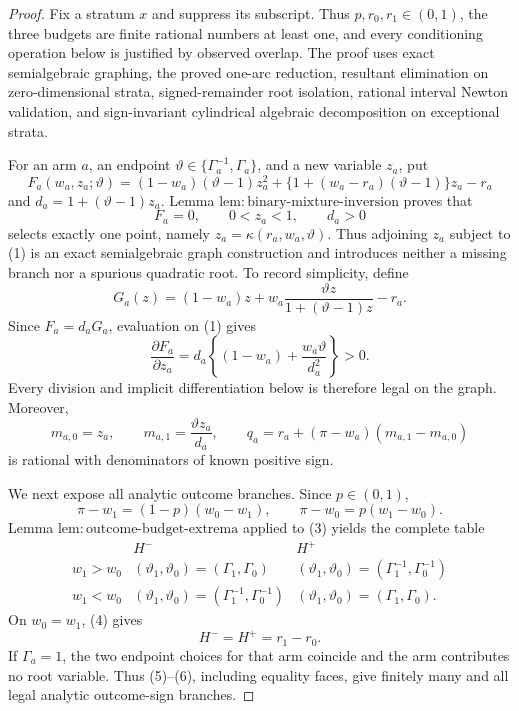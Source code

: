 \documentclass{article}
\begin{document}
\begin{proof}
Fix a stratum \(x\) and suppress its subscript.  Thus \(p,r_0,r_1\in(0,1)\), the three budgets are finite rational numbers at least one, and every conditioning operation below is justified by observed overlap.  The proof uses exact semialgebraic graphing, the proved one-arc reduction, resultant elimination on zero-dimensional strata, signed-remainder root isolation, rational interval Newton validation, and sign-invariant cylindrical algebraic decomposition on exceptional strata.

For an arm \(a\), an endpoint \(\vartheta\in\{\Gamma_a^{-1},\Gamma_a\}\), and a new variable \(z_a\), put
\[
 F_a(w_a,z_a;\vartheta)
 =(1-w_a)(\vartheta-1)z_a^2
 +\{1+(w_a-r_a)(\vartheta-1)\}z_a-r_a
\]
and \(d_a=1+(\vartheta-1)z_a\).  Lemma \(\mathrm{lem{:}binary\text{-}mixture\text{-}inversion}\) proves that
\[
 F_a=0,\qquad 0<z_a<1,\qquad d_a>0                                      \tag{1}
\]
selects exactly one point, namely \(z_a=\kappa(r_a,w_a,\vartheta)\).  Thus adjoining \(z_a\) subject to (1) is an exact semialgebraic graph construction and introduces neither a missing branch nor a spurious quadratic root.  To record simplicity, define
\[
 G_a(z)=(1-w_a)z+w_a\frac{\vartheta z}{1+(\vartheta-1)z}-r_a.
\]
Since \(F_a=d_aG_a\), evaluation on (1) gives
\[
 \frac{\partial F_a}{\partial z_a}
 =d_a\left\{(1-w_a)+\frac{w_a\vartheta}{d_a^2}\right\}>0.              \tag{2}
\]
Every division and implicit differentiation below is therefore legal on the graph.  Moreover,
\[
 m_{a,0}=z_a,\qquad
 m_{a,1}=\frac{\vartheta z_a}{d_a},\qquad
 q_a=r_a+(\pi-w_a)(m_{a,1}-m_{a,0})                                    \tag{3}
\]
is rational with denominators of known positive sign.

We next expose all analytic outcome branches.  Since \(p\in(0,1)\),
\[
 \pi-w_1=(1-p)(w_0-w_1),
 \qquad
 \pi-w_0=p(w_1-w_0).                                                    \tag{4}
\]
Lemma \(\mathrm{lem{:}outcome\text{-}budget\text{-}extrema}\) applied to (3) yields the complete table
\[
\begin{array}{c|c|c}
 &H^-&H^+\\ \hline
 w_1>w_0&(\vartheta_1,\vartheta_0)=(\Gamma_1,\Gamma_0)
         &(\vartheta_1,\vartheta_0)=(\Gamma_1^{-1},\Gamma_0^{-1})\\
 w_1<w_0&(\vartheta_1,\vartheta_0)=(\Gamma_1^{-1},\Gamma_0^{-1})
         &(\vartheta_1,\vartheta_0)=(\Gamma_1,\Gamma_0).
\end{array}                                                             \tag{5}
\]
On \(w_0=w_1\), (4) gives
\[
 H^-=H^+=r_1-r_0.                                                       \tag{6}
\]
If \(\Gamma_a=1\), the two endpoint choices for that arm coincide and the arm contributes no root variable.  Thus (5)--(6), including equality faces, give finitely many and all legal analytic outcome-sign branches.


\end{proof}
\end{document}
